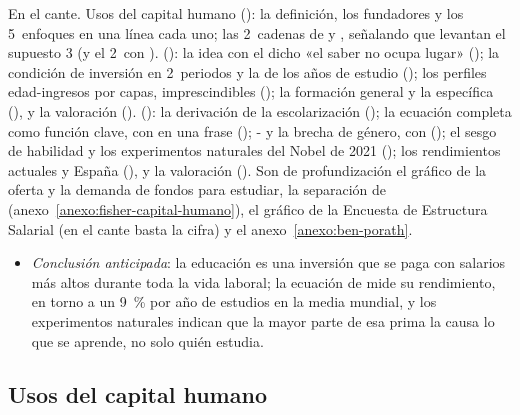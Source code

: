 \documentclass[11pt]{article}
\begin{document}
\begin{notaopositor}
En el cante. Usos del capital humano (): la definición, los fundadores y los 5~enfoques en una línea cada uno; las 2~cadenas de  y , señalando que levantan el supuesto 3 (y el 2~con ).  (): la idea con el dicho «el saber no ocupa lugar» (); la condición de inversión en 2~periodos y la de los años de estudio (); los perfiles edad-ingresos por capas, imprescindibles (); la formación general y la específica (), y la valoración ().  (): la derivación de la escolarización (); la ecuación completa como función clave, con  en una frase (); - y la brecha de género, con  (); el sesgo de habilidad y los experimentos naturales del Nobel de 2021\nocite{Nobel2021} (); los rendimientos actuales y España (), y la valoración (). Son de profundización el gráfico de la oferta y la demanda de fondos para estudiar, la separación de  (anexo~\ref{anexo:fisher-capital-humano}), el gráfico de la Encuesta de Estructura Salarial (en el cante basta la cifra) y el anexo~\ref{anexo:ben-porath}.
\end{notaopositor}

\begin{itemize}
\item \emph{Conclusión anticipada}: la educación es una inversión que se paga con salarios más altos durante toda la vida laboral; la ecuación de  mide su rendimiento, en torno a un 9~\% por año de estudios en la media mundial, y los experimentos naturales indican que la mayor parte de esa prima la causa lo que se aprende, no solo quién estudia.
\end{itemize}

\subsection{Usos del capital humano}\label{sec:usos-capital-humano}
\end{document}

